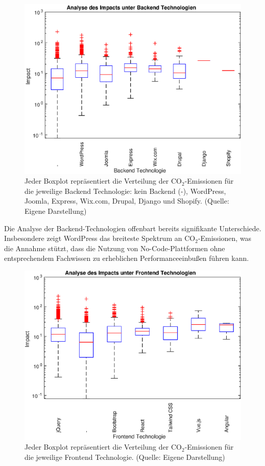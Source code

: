 \documentclass[Bachelor,BIF,german,IEEE]{BASE/twbook}
\begin{document}
\begin{figure}[hbp]
\centering
\includegraphics[width=1.0\linewidth]{matlab/distImpactbyBackend.eps}
\caption{Jeder Boxplot repräsentiert die Verteilung der CO$_2$-Emissionen für die jeweilige Backend Technologie: kein Backend (-), WordPress, Joomla, Express, Wix.com, Drupal, Django und Shopify. (Quelle: Eigene Darstellung)}
\label{Abb4}
\end{figure}

\noindent Die Analyse der Backend-Technologien offenbart bereits signifikante Unterschiede. Insbesondere zeigt WordPress das breiteste Spektrum an CO$_2$-Emissionen, was die Annahme stützt, dass die Nutzung von No-Code-Plattformen ohne entsprechendem Fachwissen zu erheblichen Performanceeinbußen führen kann.
\clearpage


\begin{figure}[htp]
\centering
\includegraphics[width=1.0\linewidth]{matlab/distImpactbyFrontend.eps}
\caption{Jeder Boxplot repräsentiert die Verteilung der CO$_2$-Emissionen für die jeweilige Frontend Technologie. (Quelle: Eigene Darstellung)}
\label{Abb5}
\end{figure}
\end{document}
